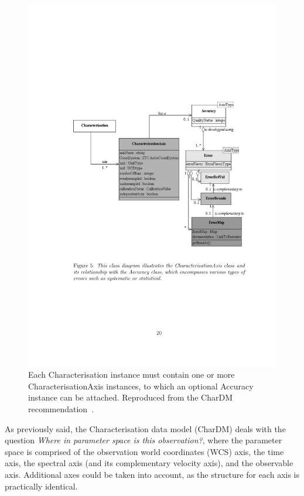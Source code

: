 			\begin{figure}[tbp]
				\centering
					\includegraphics[width=\columnwidth]
					{fig/CharDMAccuracy.pdf}
				\caption[Accuracy class and CharacterisationAxis]
				{
					Each Characterisation instance must contain one
					or more CharacterisationAxis instances, to
					which an optional Accuracy instance can be
					attached.
					Reproduced from the CharDM
					recommendation~\cite{2008dmadcrept.....L}.
				}
				\label{fig:fig_CharDMAccuracy}
			\end{figure}
			
			 As previously said, the Characterisation data model
			(CharDM) deals with the question \emph{Where in
			parameter space is this observation?}, where the
			parameter space is comprised of the observation world
			coordinates (WCS) axis, the time axis, the spectral
			axis (and its complementary velocity axis), and the
			observable axis. Additional axes could be taken into
			account, as the structure for each axis is practically
			identical.
			
